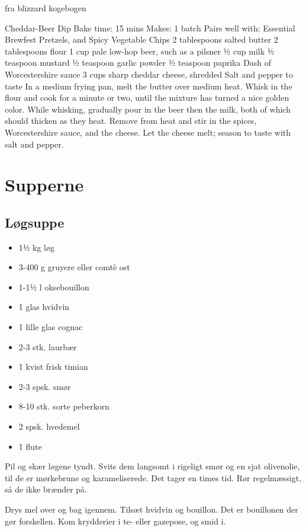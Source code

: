 \documentclass[
]{book}
\providecommand{\tightlist}{%
  \setlength{\itemsep}{0pt}\setlength{\parskip}{0pt}}
\begin{document}
fra blizzard kogebogen

Cheddar-Beer Dip
Bake time: 15 mins Makes: 1 batch
Pairs well with: Essential Brewfest Pretzels, and Spicy Vegetable Chips
2 tablespoons salted butter
2 tablespoons flour
1 cup pale low-hop beer, such as a pilsner
½ cup milk
½ teaspoon mustard
½ teaspoon garlic powder
½ teaspoon paprika
Dash of Worcestershire sauce
3 cups sharp cheddar cheese, shredded
Salt and pepper to taste
In a medium frying pan, melt the butter over medium heat.
Whisk in the flour and cook for a minute or two, until the
mixture has turned a nice golden color. While whisking,
gradually pour in the beer then the milk, both of which should
thicken as they heat. Remove from heat and stir in the spices,
Worcestershire sauce, and the cheese. Let the cheese melt;
season to taste with salt and pepper.

\chapter{Supperne}\label{supperne}

\section{Løgsuppe}\label{luxf8gsuppe}

\begin{itemize}
\tightlist
\item
  1½ kg løg
\item
  3-400 g gruyere eller comtè ost
\item
  1-1½ l oksebouillon
\item
  1 glas hvidvin
\item
  1 lille glas cognac
\item
  2-3 stk. laurbær
\item
  1 kvist frisk timian
\item
  2-3 spsk. smør
\item
  8-10 stk. sorte peberkorn
\item
  2 spsk. hvedemel
\item
  1 flute
\end{itemize}

Pil og skær løgene tyndt. Svits dem langsomt i rigeligt smør og
en sjat olivenolie, til de er mørkebrune og karameliserede. Det tager
en times tid. Rør regelmæssigt, så de ikke brænder på.

Drys mel over og bag igennem. Tilsæt hvidvin og bouillon. Det er bouillonen
der gør forskellen. Kom krydderier i te- eller gazepose, og smid i.
\end{document}
